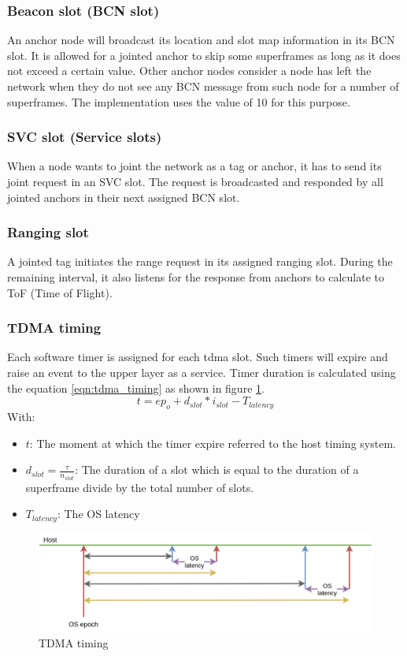 \documentclass[\main/main.tex]{subfiles}
\begin{document}
\subsubsection{Beacon slot (BCN slot)}
An anchor node will broadcast its location and slot map information in its BCN slot. It is allowed for a jointed anchor to skip some superframes as long as it does not exceed a certain value. Other anchor nodes consider a node has left the network when they do not see any BCN message from such node for a number of superframes. The implementation uses the value of 10 for this purpose.
\subsubsection{SVC slot (Service slots)}
When a node wants to joint the network as a tag or anchor, it has to send its joint request in an SVC slot. The request is broadcasted and responded by all jointed anchors in their next assigned BCN slot.
\subsubsection{Ranging slot}
A jointed tag initiates the range request in its assigned ranging slot. During the remaining interval, it also listens for the response from anchors to calculate to ToF (Time of Flight).

\subsubsection{TDMA timing}
Each software timer is assigned for each tdma slot. Such timers will expire and raise an event to the upper layer as a service. Timer duration is calculated using the equation \ref{eqn:tdma_timing} as shown in figure \ref{fig:tdma_timing}.
\begin{equation}
    t = ep_o + d_{slot}*i_{slot} - T_{latency}
    \label{eqn:tdma_timing}
\end{equation}
With: 
\begin{itemize}
    \item $t$: The moment at which the timer expire referred to the host timing system.
    \item $d_{slot} = \frac{\tau}{n_{slot}}$: The duration of a slot which is equal to the duration of a superframe divide by the total number of slots.
    \item $T_{latency}$: The OS latency
\end{itemize}

\begin{figure}[H]
    \begin{center}
        \includegraphics[scale=0.3]{tdma_timing.png}
    \end{center}
    \caption{TDMA timing}
    \label{fig:tdma_timing}
\end{figure}
\end{document}
